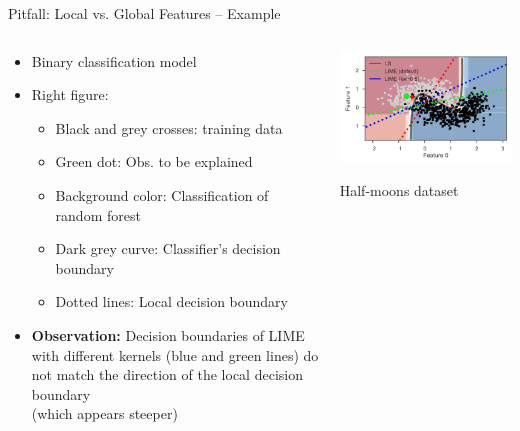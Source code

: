 \documentclass[11pt,compress,t,notes=noshow, aspectratio=169, xcolor=table]{beamer}
\begin{document}
\begin{frame}{Pitfall: Local vs. Global Features -- Example }

\begin{columns}
	\begin{column}{0.6\textwidth}
		\begin{itemize}
		\item Binary classification model
		\item Right figure: %
		\begin{itemize}
		    \item Black and grey crosses: training data
		    \item Green dot: Obs. to be explained
		    \item Background color: Classification of random forest
		    \item Dark grey curve: Classifier's decision boundary
		    \item Dotted lines: Local decision boundary
		\end{itemize}
		\item \textbf{Observation:} Decision boundaries of LIME with different kernels (blue and green lines) do not match the direction of the local decision boundary\\ (which appears steeper)
	\end{itemize}
\end{column}
\begin{column}{0.39\textwidth}

	\begin{center}
	\includegraphics[width=1\textwidth]{figure/lime-globallocal2}

	{Half-moons dataset}
	
\end{center}

	\end{column}
\end{columns}
\end{frame}
\end{document}
